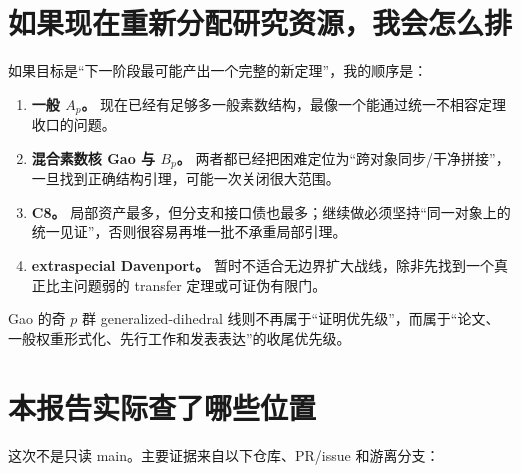 \documentclass[11pt,a4paper]{ctexart}
\begin{document}
\section{如果现在重新分配研究资源，我会怎么排}

如果目标是“下一阶段最可能产出一个完整的新定理”，我的顺序是：

\begin{enumerate}
\item \textbf{一般 $A_p$。} 现在已经有足够多一般素数结构，最像一个能通过统一不相容定理收口的问题。
\item \textbf{混合素数核 Gao 与 $B_p$。} 两者都已经把困难定位为“跨对象同步/干净拼接”，一旦找到正确结构引理，可能一次关闭很大范围。
\item \textbf{C8。} 局部资产最多，但分支和接口债也最多；继续做必须坚持“同一对象上的统一见证”，否则很容易再堆一批不承重局部引理。
\item \textbf{extraspecial Davenport。} 暂时不适合无边界扩大战线，除非先找到一个真正比主问题弱的 transfer 定理或可证伪有限门。
\end{enumerate}

Gao 的奇 $p$ 群 generalized-dihedral 线则不再属于“证明优先级”，而属于“论文、一般权重形式化、先行工作和发表表达”的收尾优先级。

\section{本报告实际查了哪些位置}

这次不是只读 main。主要证据来自以下仓库、PR/issue 和游离分支：
\end{document}

